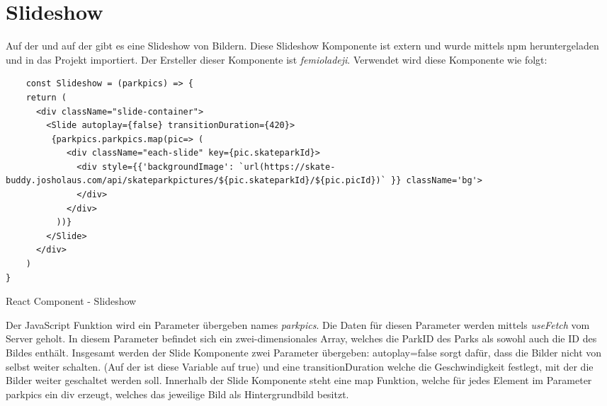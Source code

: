 \newpage
\section{Slideshow}
\label{slideshow}

Auf der \underline{} und auf der \underline{} gibt es eine Slideshow von Bildern.
Diese Slideshow Komponente ist extern und wurde mittels npm heruntergeladen und in das 
Projekt importiert. Der Ersteller dieser Komponente ist \textit{femioladeji}. Verwendet wird diese 
Komponente wie folgt:

\begin{code}[htp]
\begin{lstlisting}
    const Slideshow = (parkpics) => {
    return (
      <div className="slide-container">
        <Slide autoplay={false} transitionDuration={420}>
         {parkpics.parkpics.map(pic=> (
            <div className="each-slide" key={pic.skateparkId}>
              <div style={{'backgroundImage': `url(https://skate-buddy.josholaus.com/api/skateparkpictures/${pic.skateparkId}/${pic.picId})` }} className='bg'>
              </div>
            </div>
          ))} 
        </Slide>
      </div>
    )
}
\end{lstlisting}
\caption{React Component - Slideshow}
\end{code}

Der JavaScript Funktion wird ein Parameter übergeben names \textit{parkpics}. Die 
Daten für diesen Parameter werden mittels \textit{useFetch} vom Server geholt. In diesem Parameter 
befindet sich ein zwei-dimensionales Array, welches die ParkID des Parks als sowohl auch die ID des 
Bildes enthält. Insgesamt werden der Slide Komponente zwei Parameter übergeben: autoplay={false} sorgt
dafür, dass die Bilder nicht von selbst weiter schalten. (Auf der \underline{} ist diese Variable auf true) und
eine transitionDuration welche die Geschwindigkeit festlegt, mit der die Bilder weiter geschaltet werden soll.
Innerhalb der Slide Komponente steht eine map Funktion, welche für jedes Element im Parameter parkpics 
ein div erzeugt, welches das jeweilige Bild als Hintergrundbild besitzt. 



